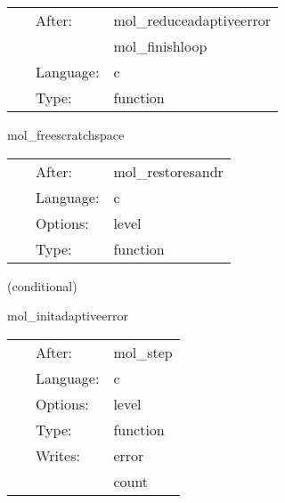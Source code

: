 \hspace{5mm}

 \begin{tabular*}{160mm}{cll} 
~ & After:  & mol\_reduceadaptiveerror \\ 
~& ~ &mol\_finishloop\\ 
~ & Language:  & c \\ 
~ & Type:  & function \\ 
\end{tabular*} 


\vspace{5mm}


\hspace{5mm} mol\_freescratchspace 

\hspace{5mm}{\it free storage for scratch levels } 


\hspace{5mm}

 \begin{tabular*}{160mm}{cll} 
~ & After:  & mol\_restoresandr \\ 
~ & Language:  & c \\ 
~ & Options:  & level \\ 
~ & Type:  & function \\ 
\end{tabular*} 


\vspace{5mm}

   (conditional) 

\hspace{5mm} mol\_initadaptiveerror 

\hspace{5mm}{\it control the step size: initialize error check variables } 


\hspace{5mm}

 \begin{tabular*}{160mm}{cll} 
~ & After:  & mol\_step \\ 
~ & Language:  & c \\ 
~ & Options:  & level \\ 
~ & Type:  & function \\ 
~ & Writes:  & error \\ 
~& ~ &count\\ 
\end{tabular*} 


\vspace{5mm}

